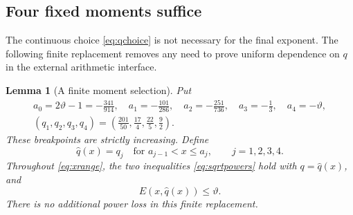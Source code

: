\documentclass[11pt,reqno]{amsart}
\numberwithin{equation}{section}
\newtheorem{lemma}[lemma]{Lemma}
\theoremstyle{definition}
\theoremstyle{remark}
\newcommand{\vth}{\vartheta}
\begin{document}
\subsection{Four fixed moments suffice}\label{sec:fourmoments}
The continuous choice \eqref{eq:qchoice} is not necessary for the final exponent.
The following finite replacement removes any need to prove uniform dependence on $q$ in the external arithmetic interface.

\begin{lemma}[A finite moment selection]\label{lem:fourmoments}
Put
\begin{gather}
 a_0=2\vth-1=-\frac{341}{914},\quad
 a_1=-\frac{101}{286},\quad a_2=-\frac{251}{736},\quad
 a_3=-\frac13,\quad a_4=-\vth,\label{eq:fourbreaks}\\
 (q_1,q_2,q_3,q_4)=
 \left(\frac{201}{50},\frac{17}{4},\frac{22}{5},\frac92\right).
 \label{eq:fourfixedqs}
\end{gather}
These breakpoints are strictly increasing. Define
\begin{equation}\label{eq:qhat}
 \widehat q(x)=q_j\quad\text{for }a_{j-1}<x\le a_j,
 \qquad j=1,2,3,4.
\end{equation}
Throughout \eqref{eq:xrange}, the two inequalities \eqref{eq:sqrtpowers} hold with $q=\widehat q(x)$, and
\begin{equation}\label{eq:fourmomentbound}
 E(x,\widehat q(x))\le\vth.
\end{equation}
There is no additional power loss in this finite replacement.
\end{lemma}
\end{document}
